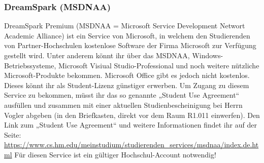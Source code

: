 \subsubsection{DreamSpark (MSDNAA)}
DreamSpark Premium (MSDNAA = Microsoft Service Development 
Networt Academic Alliance) ist ein Service von Microsoft, in welchem 
den Studierenden von Partner-Hochschulen kostenlose Software der 
Firma Microsoft zur Verfügung gestellt wird. \doublebreak
Unter anderem könnt ihr über das MSDNAA, Windows-Betriebssysteme, 
Microsoft Visiual Studio-Professional und noch weitere nützliche 
Microsoft-Produkte bekommen. Microsoft Office gibt es jedoch nicht 
kostenlos. Dieses könnt ihr als Student-Lizenz günstiger erwerben. \doublebreak
Um Zugang zu diesem Service zu bekommen, müsst ihr das so genannte 
„Student Use Agreement“ ausfüllen und zusammen mit einer aktuellen 
Studienbescheinigung bei Herrn Vogler abgeben (in den Briefkasten, 
direkt vor dem Raum R1.011 einwerfen). \doublebreak
Den Link zum „Student Use Agreement“ und weitere Informationen 
findet ihr auf der Seite: \doublebreak
\url{https://www.cs.hm.edu/meinstudium/studierenden_services/msdnaa/index.de.html}
Für diesen Service ist ein gültiger Hochschul-Account notwendig!